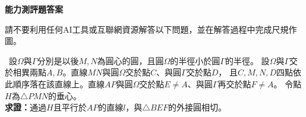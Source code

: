 \documentclass{article}
\newcommand{\INDEX}[1]{\fbox{\textbf{#1}}\ }
\begin{document}
\thispagestyle{fancy}  %
\begin{center}
  \textbf{\Large{能力測評題答案}}
\end{center}
請不要利用任何AI工具或互聯網資源解答以下問題，並在解答過程中完成尺規作圖。

\INDEX{問題1}設$\Omega$與$\Gamma$分別是以後$M,N$為圓心的圓，且圓$\Omega$的半徑小於圓$\Gamma$的半徑。
設$\Omega$與$\Gamma$交於相異兩點$A,B$。直線$MN$與圓$\Omega$交於點$C$、與圓$\Gamma$交於點$D$，
且$C,M,N,D$四點依此順序落在該直線上。直線$AP$與圓$\Omega$交於點$E\neq A$、與圓$\Gamma$再交於點$F\neq A$。
令點$H$為$\triangle{PMN}$的垂心。\\[0.5em]
\textbf{求證：}通過$H$且平行於$AP$的直線$l$，與$\triangle{BEF}$的外接圓相切。
\end{document}
